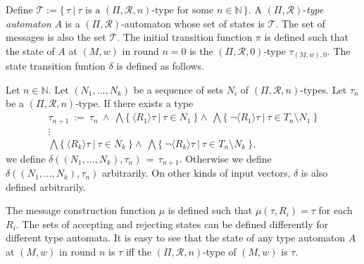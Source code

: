 \documentclass[copyright,creativecommons]{eptcs}
\begin{document}
Define $\mathcal{T} := \{\, \tau\ |\ \tau\text{ is a }(\Pi,\mathcal{R},n)\text{-type for some }n\in\mathbb{N}\, \}$.
A $(\Pi,\mathcal{R})$-\emph{type automaton} $A$ 
is a $(\Pi,\mathcal{R})$-automaton whose set of states is $\mathcal{T}$.
The set of messages is also the set $\mathcal{T}$.
The initial transition function $\pi$ is defined such that the state of $A$ at $(M,w)$
in round $n=0$ is the $(\Pi,\mathcal{R},0)$-type $\tau_{(M,w),0}$.
The state transition funtion $\delta$ is defined as follows.




Let $n\in\mathbb{N}$. Let $(N_1,...,N_k)$ be a sequence of sets $N_i$ of $(\Pi,\mathcal{R},n)$-types.
Let $\tau_n$ be a $(\Pi,\mathcal{R},n)$-type.
If there exists a type 
\begin{multline*}
\tau_{n+1}\ :=\ \tau_n\ \wedge\ \bigwedge\{\ \langle R_1\rangle \tau\ |\
\tau\in N_1\ \}
\wedge\ \bigwedge\{\ \neg\langle R_1\rangle \tau\ |\ \tau\in T_n\setminus N_1\ \}\\
\vdots\\
\bigwedge\{\ \langle R_k\rangle \tau\ |\
\tau\in N_k\ \}
\wedge\ \bigwedge\{\ \neg\langle R_k\rangle \tau\ |\ \tau\in T_n\setminus N_k\ \},
\end{multline*}
we define $\delta((N_1,...,N_k),\tau_n)\, =\, \tau_{n+1}$.
Otherwise we define $\delta((N_1,...,N_k),\tau_n)$ arbitrarily.
On other kinds of input vectors, $\delta$ is also defined arbitrarily.





The message construction function $\mu$ is defined such that $\mu(\tau, R_i) = \tau$ for each $R_i$.
The sets of accepting and rejecting states can be defined differently
for different type automata.
It is easy to see that the state of any type automaton $A$ at $(M,w)$ in round $n$ is $\tau$
iff the $(\Pi,\mathcal{R},n)$-type of $(M,w)$ is $\tau$.
\end{document}
